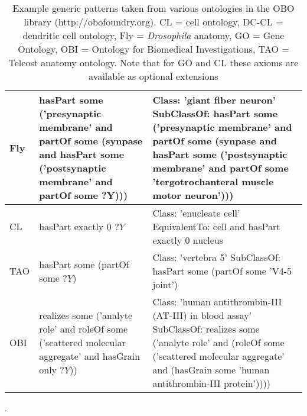 \documentclass{llncs}
\begin{document}
\begin{table}
\begin{tabular}{ | p{1.1cm} | p{4cm} | p{7cm} | }
      \hline

      Fly &

      hasPart some ('presynaptic membrane' and partOf some (synpase
      and hasPart some ('postsynaptic membrane' and partOf some ?Y)))

      &

      Class: 'giant fiber neuron' \newline SubClassOf: hasPart some
      ('presynaptic membrane' and partOf some (synpase and hasPart
      some ('postsynaptic membrane' and partOf some 'tergotrochanteral
      muscle motor neuron')))

      \\

      \hline

      CL &

      hasPart exactly 0 $?Y$

      &

      Class: 'enucleate cell' \newline
      EquivalentTo: cell and hasPart exactly 0 nucleus

      \\

      \hline

      TAO &

      hasPart some (partOf some $?Y$)

      &

      Class: 'vertebra 5' \newline
      SubClassOf: hasPart some (partOf some 'V4-5 joint')

      \\

      \hline

      OBI &

      realizes some ('analyte role' and roleOf some ('scattered molecular aggregate' and hasGrain only $?Y$))

      &

      Class: 'human antithrombin-III (AT-III) in blood assay' \newline
      SubClassOf: realizes some ('analyte role' and (roleOf some 
      ('scattered molecular aggregate' and (hasGrain some 'human antithrombin-III protein'))))

      \\

      \hline
    \end{tabular}
    \caption{Example generic patterns taken from various ontologies in
      the OBO library (http://obofoundry.org). CL = cell ontology,
      DC-CL = dendritic cell ontology, Fly = \emph{Drosophila}
      anatomy, GO = Gene Ontology, OBI = Ontology for Biomedical
      Investigations, TAO = Teleost anatomy ontology. Note that for GO
      and CL these axioms are available as optional
      extensions\cite{Mungall_GOXP_2010}\cite{Diehl_ICBO_2009}}.
    \label{tab:example-templates}
  \end{table}
\end{document}
